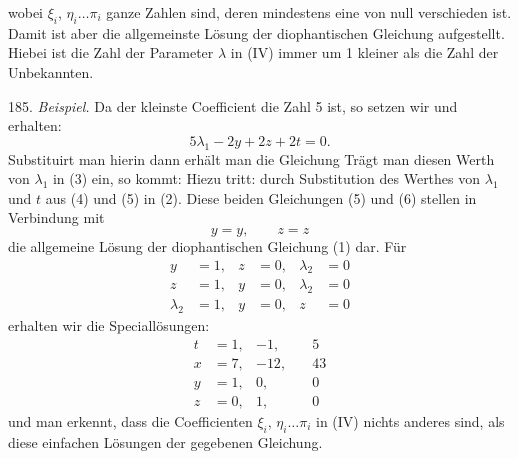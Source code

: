 wobei $\xi_i$, $\eta_i \ldots \pi_i$ ganze Zahlen sind, deren mindestens eine von null verschieden ist. Damit ist aber die allgemeinste Lösung der diophantischen Gleichung aufgestellt. Hiebei ist die Zahl der Parameter $\lambda$ in (IV) immer um 1 kleiner als die Zahl der Unbekannten.

185. \textit{Beispiel.}
Da der kleinste Coefficient die Zahl 5 ist, so setzen wir
und erhalten:
\[
5\lambda_1 - 2y + 2z + 2t = 0.
\]
Substituirt man hierin
dann erhält man die Gleichung
Trägt man diesen Werth von $\lambda_1$ in (3) ein, so kommt:
Hiezu tritt:
durch Substitution des Werthes von $\lambda_1$ und $t$ aus (4) und (5) in (2). Diese beiden Gleichungen (5) und (6) stellen in Verbindung mit
\[
y=y, \qquad z=z
\]
die allgemeine Lösung der diophantischen Gleichung (1) dar. Für
\[
\begin{aligned}
y&=1, & z&=0, & \lambda_2&=0\\
z&=1, & y&=0, & \lambda_2&=0\\
\lambda_2&=1, & y&=0, & z&=0
\end{aligned}
\]
erhalten wir die Speciallösungen:
\[
\begin{aligned}
t&=1, & -1, & \quad 5\\
x&=7, & -12, & \quad 43\\
y&=1, & 0, & \quad 0 %
\\
z&=0, & 1, & \quad 0
\end{aligned}
\]
und man erkennt, dass die Coefficienten $\xi_i$, $\eta_i \ldots \pi_i$ in (IV) nichts anderes sind, als diese einfachen Lösungen der gegebenen Gleichung.


